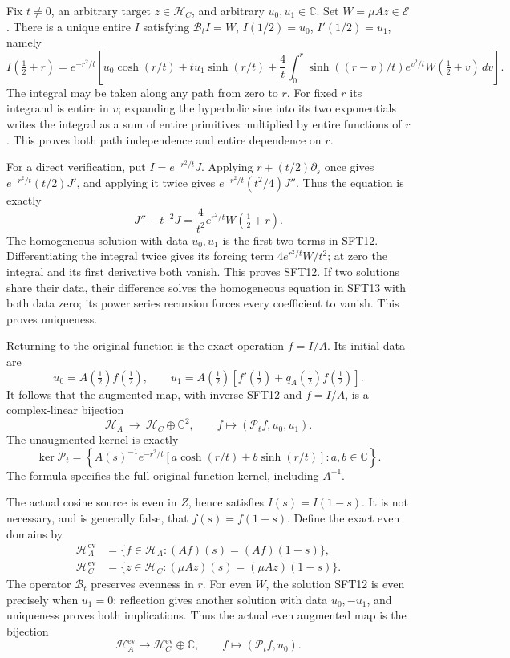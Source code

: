 \documentclass[
  10pt,
  a4paper,
]{article}
\begin{document}
Fix \(t\ne0\), an arbitrary target \(z\in\mathcal H_C\), and arbitrary
\(u_0,u_1\in\mathbb C\). Set \(W=\mu Az\in\mathcal E\). There is a
unique entire \(I\) satisfying \(\mathcal B_tI=W\), \(I(1/2)=u_0\),
\(I'(1/2)=u_1\), namely \[
 \boxed{\displaystyle
 I(\tfrac12+r)=e^{-r^2/t}\left[
 u_0\cosh(r/t)+t u_1\sinh(r/t)
 +\frac4t\int_0^r
     \sinh((r-v)/t)e^{v^2/t}W(\tfrac12+v)\,dv
                         \right].}
 \tag{SFT12}
\] The integral may be taken along any path from zero to \(r\). For
fixed \(r\) its integrand is entire in \(v\); expanding the hyperbolic
sine into its two exponentials writes the integral as a sum of entire
primitives multiplied by entire functions of \(r\). This proves both
path independence and entire dependence on \(r\).

For a direct verification, put \(I=e^{-r^2/t}J\). Applying
\(r+(t/2)\partial_s\) once gives \(e^{-r^2/t}(t/2)J'\), and applying it
twice gives \(e^{-r^2/t}(t^2/4)J''\). Thus the equation is exactly \[
 J''-t^{-2}J=\frac4{t^2}e^{r^2/t}W(\tfrac12+r).
 \tag{SFT13}
\] The homogeneous solution with data \(u_0,u_1\) is the first two terms
in SFT12. Differentiating the integral twice gives its forcing term
\(4e^{r^2/t}W/t^2\); at zero the integral and its first derivative both
vanish. This proves SFT12. If two solutions share their data, their
difference solves the homogeneous equation in SFT13 with both data zero;
its power series recursion forces every coefficient to vanish. This
proves uniqueness.

Returning to the original function is the exact operation \(f=I/A\). Its
initial data are \[
 u_0=A(\tfrac12)f(\tfrac12),\qquad
 u_1=A(\tfrac12)
       [f'(\tfrac12)+q_A(\tfrac12)f(\tfrac12)].
 \tag{SFT14}
\] It follows that the augmented map, with inverse SFT12 and \(f=I/A\),
is a complex-linear bijection \[
 \mathcal H_A\ \longrightarrow\
          \mathcal H_C\oplus\mathbb C^2,\qquad
 f\longmapsto(\mathcal P_tf,u_0,u_1).
 \tag{SFT15}
\] The unaugmented kernel is exactly \[
 \ker\mathcal P_t=
 \left\{A(s)^{-1}e^{-r^2/t}
       [a\cosh(r/t)+b\sinh(r/t)]:a,b\in\mathbb C\right\}.
 \tag{SFT16}
\] The formula specifies the full original-function kernel, including
\(A^{-1}\).

The actual cosine source is even in \(Z\), hence satisfies
\(I(s)=I(1-s)\). It is not necessary, and is generally false, that
\(f(s)=f(1-s)\). Define the exact even domains by \[
 \begin{aligned}
 \mathcal H_A^{\mathrm{ev}}
   &=\{f\in\mathcal H_A:(Af)(s)=(Af)(1-s)\},\\
 \mathcal H_C^{\mathrm{ev}}
   &=\{z\in\mathcal H_C:(\mu Az)(s)=(\mu Az)(1-s)\}.
 \end{aligned}
 \tag{SFT17}
\] The operator \(\mathcal B_t\) preserves evenness in \(r\). For even
\(W\), the solution SFT12 is even precisely when \(u_1=0\): reflection
gives another solution with data \(u_0,-u_1\), and uniqueness proves
both implications. Thus the actual even augmented map is the bijection
\[
 \mathcal H_A^{\mathrm{ev}}
       \longrightarrow \mathcal H_C^{\mathrm{ev}}\oplus\mathbb C,
       \qquad f\longmapsto(\mathcal P_tf,u_0).
 \tag{SFT18}
\]
\end{document}

